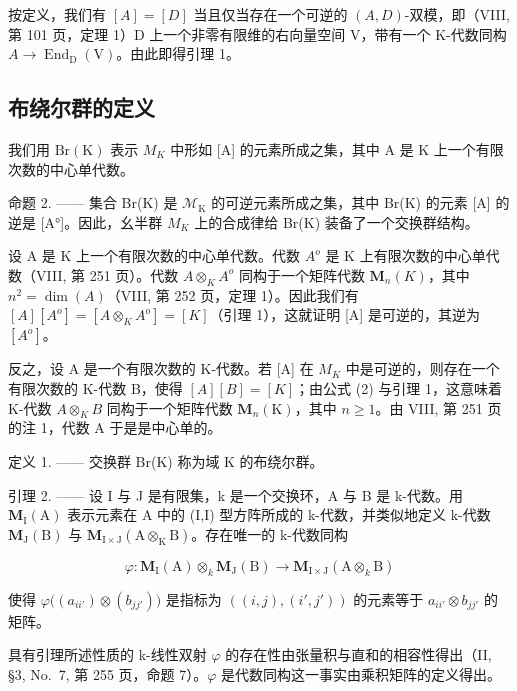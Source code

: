 按定义，我们有 \([A]=[D]\) 当且仅当存在一个可逆的 \((A,D)\)-双模，即（VIII, 第 101 页，定理 1）D 上一个非零有限维的右向量空间 V，带有一个 K-代数同构 \(A\to\operatorname{End}_{\mathrm{D}}(\mathrm{V})\)。由此即得引理 1。

\subsection{布绕尔群的定义}

我们用 \(\mathrm{Br}(\mathrm{K})\) 表示 \(M_{K}\) 中形如 {[}A{]} 的元素所成之集，其中 A 是 K 上一个有限次数的中心单代数。

命题 2. —— 集合 Br(K) 是 \(\mathcal{M}_{\mathrm{K}}\) 的可逆元素所成之集，其中 Br(K) 的元素 {[}A{]} 的逆是 {[}A°{]}。因此，幺半群 \(M_{K}\) 上的合成律给 Br(K) 装备了一个交换群结构。

设 A 是 K 上一个有限次数的中心单代数。代数 \(A^{o}\) 是 K 上有限次数的中心单代数（VIII, 第 251 页）。代数 \(A \otimes_{K} A^{o}\) 同构于一个矩阵代数 \(\mathbf{M}_{n}(K)\)，其中 \(n^{2} = \dim(A)\)（VIII, 第 252 页，定理 1）。因此我们有 \([A][A^{o}] = [A \otimes_{K} A^{o}] = [K]\)（引理 1），这就证明 {[}A{]} 是可逆的，其逆为 \([A^{o}]\)。

反之，设 A 是一个有限次数的 K-代数。若 {[}A{]} 在 \(M_{K}\) 中是可逆的，则存在一个有限次数的 K-代数 B，使得 \([A][B]=[K]\)；由公式 (2) 与引理 1，这意味着 K-代数 \(A \otimes_{K} B\) 同构于一个矩阵代数 \(\mathbf{M}_{n}(\mathrm{K})\)，其中 \(n \geqslant 1\)。由 VIII, 第 251 页的注 1，代数 A 于是是中心单的。

定义 1. —— 交换群 Br(K) 称为域 K 的布绕尔群。

引理 2. —— 设 I 与 J 是有限集，k 是一个交换环，A 与 B 是 k-代数。用 \(\mathbf{M}_{\mathrm{I}}(\mathrm{A})\) 表示元素在 A 中的 (I,I) 型方阵所成的 k-代数，并类似地定义 k-代数 \(\mathbf{M}_{\mathrm{J}}(\mathrm{B})\) 与 \(\mathbf{M}_{\mathrm{I}\times\mathrm{J}}(\mathrm{A}\otimes_{\mathrm{K}}\mathrm{B})\)。存在唯一的 k-代数同构

\[
\varphi : \mathbf {M} _ {\mathrm{I}} (\mathrm{A}) \otimes_ {k} \mathbf {M} _ {\mathrm{J}} (\mathrm{B}) \longrightarrow \mathbf {M} _ {\mathrm{I} \times \mathrm{J}} (\mathrm{A} \otimes_ {k} \mathrm{B})
\]

使得 \(\varphi\big((a_{ii'})\otimes(b_{jj'})\big)\) 是指标为 \(((i,j),(i',j'))\) 的元素等于 \(a_{ii'}\otimes b_{jj'}\) 的矩阵。

具有引理所述性质的 k-线性双射 \(\varphi\) 的存在性由张量积与直和的相容性得出（II, §3, No.~7, 第 255 页，命题 7）。\(\varphi\) 是代数同构这一事实由乘积矩阵的定义得出。

